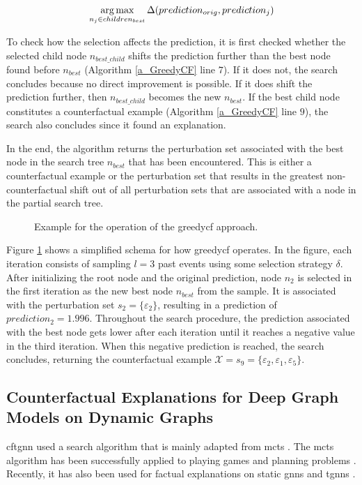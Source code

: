 \begin{equation}
    \operatorname*{arg\,max}_{n_j \in children_{best}} \Delta(prediction_{orig}, prediction_j)
\end{equation}

To check how the selection affects the prediction, it is first checked whether the selected child node $n_{best\_child}$ shifts the prediction further than the best node found before $n_{best}$ (Algorithm \ref{a_GreedyCF} line $7$). If it does not, the search concludes because no direct improvement is possible. If it does shift the prediction further, then $n_{best\_child}$ becomes the new $n_{best}$. If the best child node constitutes a counterfactual example (Algorithm \ref{a_GreedyCF} line $9$), the search also concludes since it found an explanation.

In the end, the algorithm returns the perturbation set associated with the best node in the search tree $n_{best}$ that has been encountered. This is either a counterfactual example or the perturbation set that results in the greatest non-counterfactual shift out of all perturbation sets that are associated with a node in the partial search tree.

\FloatBarrier
\begin{figure}[ht]
    \centering
    
    \caption{Example for the operation of the \gls{greedycf} approach.}
    \label{f_GreedyBaseline}
\end{figure}


Figure \ref{f_GreedyBaseline} shows a simplified schema for how \gls{greedycf} operates. In the figure, each iteration consists of sampling $l = 3$ past events using some selection strategy $\delta$. After initializing the root node and the original prediction, node $n_2$ is selected in the first iteration as the new best node $n_{best}$ from the sample. It is associated with the perturbation set $s_2 = \{\varepsilon_2\}$, resulting in a prediction of $prediction_2 = 1.996$. Throughout the search procedure, the prediction associated with the best node gets lower after each iteration until it reaches a negative value in the third iteration. When this negative prediction is reached, the search concludes, returning the counterfactual example $\mathcal{X} = s_9 = \{\varepsilon_2, \varepsilon_1, \varepsilon_5\}$.


\FloatBarrier
\subsection{Counterfactual Explanations for Deep Graph Models on Dynamic Graphs}
\label{s_Methodology_CoDy}
\acrfull{cftgnn} used a search algorithm that is mainly adapted from \gls{mcts} \cite{kocsis_bandit_2006, silver_mastering_2017}. The \gls{mcts} algorithm has been successfully applied to playing games \cite{silver_mastering_2017} and planning problems \cite{browne_survey_2012}. Recently, it has also been used for factual explanations on static \glspl{gnn} \cite{yuan_explainability_2021, zhang_gstarx_2022} and \glspl{tgnn} \cite{xia_explaining_2023}. 

